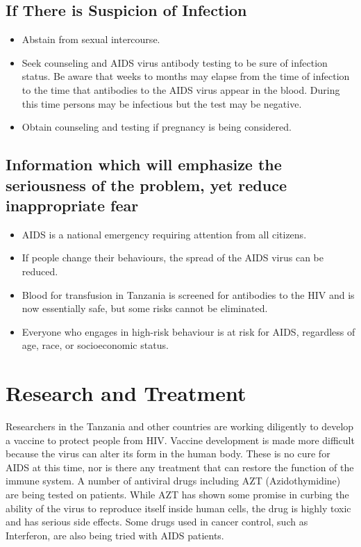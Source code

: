 \subsection{If There is Suspicion of Infection}

\begin{itemize}
\item Abstain from sexual intercourse.
\item Seek counseling and AIDS virus antibody testing to be sure of infection status. Be aware
that weeks to months may elapse from the time of infection to the time that antibodies to
the AIDS virus appear in the blood. During this time persons may be infectious but the test
may be negative.
\item Obtain counseling and testing if pregnancy is being considered.
\end{itemize}

\subsection{Information which will emphasize the seriousness of the problem, yet reduce
inappropriate fear}

\begin{itemize}
\item AIDS is a national emergency requiring attention from all citizens.
\item If people change their behaviours, the spread of the AIDS virus can be reduced.
\item Blood for transfusion in Tanzania is screened for antibodies to the HIV and is now
essentially safe, but some risks cannot be eliminated.
\item Everyone who engages in high-risk behaviour is at risk for AIDS, regardless of age, race,
or socioeconomic status.
\end{itemize}

\section{Research and Treatment}

Researchers in the Tanzania and other countries are working diligently to develop a vaccine
to protect people from HIV. Vaccine development is made more difficult because the virus can
alter its form in the human body. These is no cure for AIDS at this time, nor is there any
treatment that can restore the function of the immune system. A number of antiviral drugs
including AZT (Azidothymidine) are being tested on patients. While AZT has shown some
promise in curbing the ability of the virus to reproduce itself inside human cells, the drug is
highly toxic and has serious side effects. Some drugs used in cancer control, such as
Interferon, are also being tried with AIDS patients.

